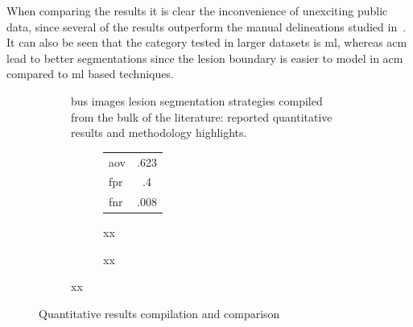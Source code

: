 When comparing the results it is clear the inconvenience of unexciting public data, since several of the results outperform the manual delineations studied in~\cite{gerard2013}.
It can also be seen that the category tested in larger datasets is \ac{ml}, whereas \ac{acm} lead to better segmentations since the lesion boundary is easier to model in \ac{acm} compared to \ac{ml} based techniques.


\begin{figure}[h]
  \begin{subfigure}[b]{\textwidth}
    {\tiny }
    \caption{\ac{bus} images lesion segmentation strategies compiled from the bulk of the literature: reported quantitative results and methodology highlights.}
    \label{fig:surveyResults:survey}
  \end{subfigure}
  \begin{subfigure}[b]{\textwidth}
    \begin{subfigure}[b]{0.2\textwidth}
      \begin{tabular}{lc}
        \ac{aov}& .623 \\
        \ac{fpr}& .4 \\
        \ac{fnr}& .008 \\
      \end{tabular}
      \caption{xx}
      \label{fig:surveyResults:method}
    \end{subfigure}
    \begin{subfigure}[b]{0.8\textwidth}
      {\tiny  }
      \caption{{\small xx}}
      \label{fig:surveyResults:comparison}
    \end{subfigure}
  \end{subfigure}
  \hfill
  \caption{Quantitative results compilation and comparison}
  \label{fig:surveyResults}
\end{figure}


